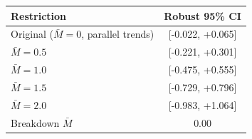 \begin{tabular}{lc}
\toprule
Restriction & Robust 95\% CI \\
\midrule
Original ($\bar{M}=0$, parallel trends) & [-0.022, +0.065] \\
$\bar{M}=0.5$ & [-0.221, +0.301] \\
$\bar{M}=1.0$ & [-0.475, +0.555] \\
$\bar{M}=1.5$ & [-0.729, +0.796] \\
$\bar{M}=2.0$ & [-0.983, +1.064] \\
\midrule
Breakdown $\bar{M}$ & 0.00 \\
\bottomrule
\end{tabular}
